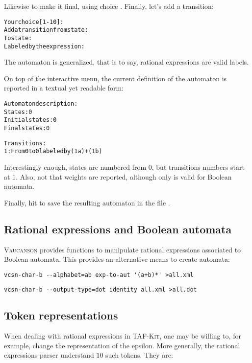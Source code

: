 \documentclass[a4paper]{report}
\newenvironment{shell}
{\begin{alltt}}
{\end{alltt}}
\newcommand{\tafkit}{\textsc{TAF-Kit}\xspace}
\newcommand{\Vauc}{\textsc{Vaucanson}\xspace}
\newcommand{\withweighttt}[2]{\symbol{`\{}#1\symbol{`\}} #2}
\begin{document}
Likewise to make it final, using choice .  Finally, let's add a
transition:

\begin{shell}
Your choice [1-10]: 
  Add a transition from state: 
  To state: 
  Labeled by the expression: 
\end{shell}

\noindent
The automaton is generalized, that is to say, rational expressions are
valid labels.

On top of the interactive menu, the current definition of the
automaton is reported in a textual yet readable form:

\begin{shell}
Automaton description:
  States: 0
  Initial states: 0
  Final states: 0

  Transitions:
    1: From 0 to 0 labeled by (\withweighttt{1}{a})+(\withweighttt{1}{b})
\end{shell}

\noindent
Interestingly enough, states are numbered from 0, but transitions
numbers start at 1.  Also, not that weights are reported, although
only  is valid for Boolean automata.

Finally, hit  to save the resulting automaton in the file
.

\subsection{Rational expressions and Boolean automata}

\Vauc provides functions to manipulate rational expressions associated
to Boolean automata.  This provides an alternative means to create
automata:

\begin{verbatim}
vcsn-char-b --alphabet=ab exp-to-aut '(a+b)*' >all.xml
\end{verbatim}
\begin{verbatim}
vcsn-char-b --output-type=dot identity all.xml >all.dot
\end{verbatim}

\subsection{Token representations}

When dealing with rational expressions in \tafkit, one may be willing to,
for example, change the representation of the epsilon. More generally,
the rational expressions parser understand $10$ such tokens. They are:
\end{document}
